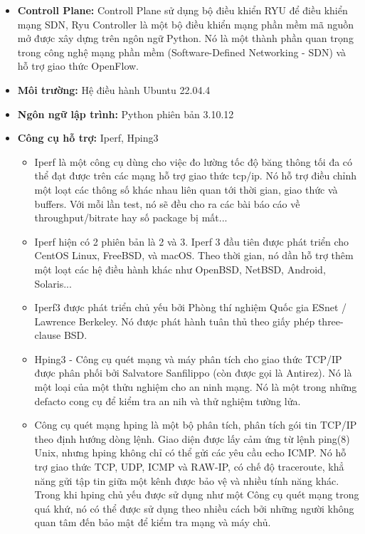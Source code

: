 \documentclass[a4paper]{article}
\begin{document}
\begin{itemize}
    \item \textbf{Controll Plane: }Controll Plane sử dụng bộ điều khiển RYU\cite{ryu-controller} để điều khiển mạng SDN, Ryu Controller là một bộ điều khiển mạng phần mềm mã nguồn mở được xây dựng trên ngôn ngữ Python. Nó là một thành phần quan trọng trong công nghệ mạng phần mềm (Software-Defined Networking - SDN) và hỗ trợ giao thức OpenFlow.
    \item \textbf{Môi trường: } Hệ điều hành Ubuntu 22.04.4
    \item \textbf{Ngôn ngữ lập trình: } Python phiên bản 3.10.12
    \item \textbf{Công cụ hỗ trợ: }Iperf\cite{iperf}, Hping3\cite{hping3}
    \begin{itemize}[label={}]
        \item Iperf là một công cụ dùng cho việc đo lường tốc độ băng thông tối đa có thể đạt được trên các mạng hỗ trợ giao thức tcp/ip. Nó hỗ trợ điều chỉnh một loạt các thông số khác nhau liên quan tới thời gian, giao thức và buffers. Với mỗi lần test, nó sẽ đều cho ra các bài báo cáo về throughput/bitrate hay số package bị mất...
        \item Iperf hiện có 2 phiên bản là 2 và 3. Iperf 3 đầu tiên được phát triển cho CentOS Linux, FreeBSD, và macOS. Theo thời gian, nó dần hỗ trợ thêm một loạt các hệ điều hành khác như OpenBSD, NetBSD, Android, Solaris...
        \item Iperf3 được phát triển chủ yếu bởi Phòng thí nghiệm Quốc gia ESnet / Lawrence Berkeley. Nó được phát hành tuân thủ theo giấy phép three-clause BSD.
        \item Hping3 - Công cụ quét mạng và máy phân tích cho giao thức TCP/IP được phân phối bởi Salvatore Sanfilippo (còn được gọi là Antirez). Nó là một loại của một thửu nghiệm cho an ninh mạng. Nó là một trong những defacto cong cụ để kiểm tra an nih và thử nghiệm tường lửa.
        \item Công cụ quét mạng hping là một bộ phân tích, phân tích gói tin TCP/IP theo định hướng dòng lệnh. Giao diện được lấy cảm ứng từ lệnh ping(8) Unix, nhưng hping không chỉ có thể gửi các yêu cầu echo ICMP. Nó hỗ trợ giao thức TCP, UDP, ICMP và RAW-IP, có chế độ traceroute, khẳ năng gửi tập tin giữa một kênh được bảo vệ và nhiều tính năng khác. Trong khi hping chủ yếu được sử dụng như một Công cụ quét mạng trong quá khứ, nó có thể được sử dụng theo nhiều cách bởi những người không quan tâm đến bảo mật để kiểm tra mạng và máy chủ.
    \end{itemize}
\end{itemize}
\end{document}
